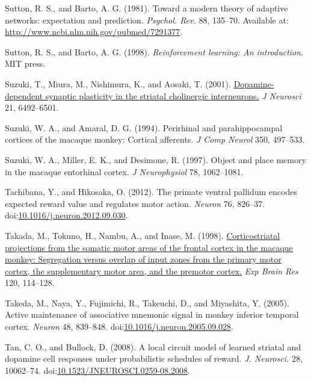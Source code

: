 \documentclass[
  11pt,
  a4paper,
]{scrbook}
\newlength{\cslhangindent}
\newenvironment{CSLReferences}[2] %
 {\begin{list}{}{%
  \setlength{\itemindent}{0pt}
  \setlength{\leftmargin}{0pt}
  \setlength{\parsep}{0pt}
  \ifodd #1
   \setlength{\leftmargin}{\cslhangindent}
   \setlength{\itemindent}{-1\cslhangindent}
  \fi
  \setlength{\itemsep}{#2\baselineskip}}}
 {\end{list}}
\begin{document}
\begin{CSLReferences}{1}{1}
Sutton, R. S., and Barto, A. G. (1981). {Toward a modern theory of
adaptive networks: expectation and prediction.} \emph{Psychol. Rev.} 88,
135--70. Available at: \url{http://www.ncbi.nlm.nih.gov/pubmed/7291377}.

Sutton, R. S., and Barto, A. G. (1998). \emph{{Reinforcement learning:
An introduction}}. MIT press.

Suzuki, T., Miura, M., Nishimura, K., and Aosaki, T. (2001).
\href{https://www.ncbi.nlm.nih.gov/pubmed/11517238}{Dopamine-dependent
synaptic plasticity in the striatal cholinergic interneurons.} \emph{J
Neurosci} 21, 6492--6501.

Suzuki, W. A., and Amaral, D. G. (1994). Perirhinal and parahippocampal
cortices of the macaque monkey: Cortical afferents. \emph{J Comp Neurol}
350, 497--533.

Suzuki, W. A., Miller, E. K., and Desimone, R. (1997). Object and place
memory in the macaque entorhinal cortex. \emph{J Neurophysiol} 78,
1062--1081.

Tachibana, Y., and Hikosaka, O. (2012). {The primate ventral pallidum
encodes expected reward value and regulates motor action.} \emph{Neuron}
76, 826--37.
doi:\href{https://doi.org/10.1016/j.neuron.2012.09.030}{10.1016/j.neuron.2012.09.030}.

Takada, M., Tokuno, H., Nambu, A., and Inase, M. (1998).
\href{https://www.ncbi.nlm.nih.gov/pubmed/9628410}{Corticostriatal
projections from the somatic motor areas of the frontal cortex in the
macaque monkey: Segregation versus overlap of input zones from the
primary motor cortex, the supplementary motor area, and the premotor
cortex.} \emph{Exp Brain Res} 120, 114--128.

Takeda, M., Naya, Y., Fujimichi, R., Takeuchi, D., and Miyashita, Y.
(2005). Active maintenance of associative mnemonic signal in monkey
inferior temporal cortex. \emph{Neuron} 48, 839--848.
doi:\href{https://doi.org/10.1016/j.neuron.2005.09.028}{10.1016/j.neuron.2005.09.028}.

Tan, C. O., and Bullock, D. (2008). {A local circuit model of learned
striatal and dopamine cell responses under probabilistic schedules of
reward.} \emph{J. Neurosci.} 28, 10062--74.
doi:\href{https://doi.org/10.1523/JNEUROSCI.0259-08.2008}{10.1523/JNEUROSCI.0259-08.2008}.


\end{CSLReferences}
\end{document}
